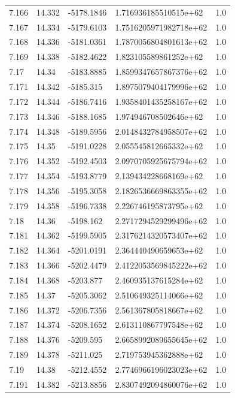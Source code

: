\begin{tabular}{lllll}
7.166 & 14.332 & -5178.1846 & 1.716936185510515e+62 & 1.0 \\
7.167 & 14.334 & -5179.6103 & 1.7516205971982718e+62 & 1.0 \\
7.168 & 14.336 & -5181.0361 & 1.7870056804801613e+62 & 1.0 \\
7.169 & 14.338 & -5182.4622 & 1.823105589861252e+62 & 1.0 \\
7.17 & 14.34 & -5183.8885 & 1.8599347657867376e+62 & 1.0 \\
7.171 & 14.342 & -5185.315 & 1.8975079404179996e+62 & 1.0 \\
7.172 & 14.344 & -5186.7416 & 1.9358401435258167e+62 & 1.0 \\
7.173 & 14.346 & -5188.1685 & 1.974946708502646e+62 & 1.0 \\
7.174 & 14.348 & -5189.5956 & 2.0148432784958507e+62 & 1.0 \\
7.175 & 14.35 & -5191.0228 & 2.055545812665332e+62 & 1.0 \\
7.176 & 14.352 & -5192.4503 & 2.0970705925675794e+62 & 1.0 \\
7.177 & 14.354 & -5193.8779 & 2.139434228668169e+62 & 1.0 \\
7.178 & 14.356 & -5195.3058 & 2.1826536669863355e+62 & 1.0 \\
7.179 & 14.358 & -5196.7338 & 2.226746195873795e+62 & 1.0 \\
7.18 & 14.36 & -5198.162 & 2.2717294529299496e+62 & 1.0 \\
7.181 & 14.362 & -5199.5905 & 2.3176214320573407e+62 & 1.0 \\
7.182 & 14.364 & -5201.0191 & 2.364440490659653e+62 & 1.0 \\
7.183 & 14.366 & -5202.4479 & 2.4122053569845222e+62 & 1.0 \\
7.184 & 14.368 & -5203.877 & 2.460935137615284e+62 & 1.0 \\
7.185 & 14.37 & -5205.3062 & 2.510649325114066e+62 & 1.0 \\
7.186 & 14.372 & -5206.7356 & 2.561367805818667e+62 & 1.0 \\
7.187 & 14.374 & -5208.1652 & 2.613110867797548e+62 & 1.0 \\
7.188 & 14.376 & -5209.595 & 2.6658992089655645e+62 & 1.0 \\
7.189 & 14.378 & -5211.025 & 2.719753945362888e+62 & 1.0 \\
7.19 & 14.38 & -5212.4552 & 2.7746966196023023e+62 & 1.0 \\
7.191 & 14.382 & -5213.8856 & 2.8307492094860076e+62 & 1.0 \\

\end{tabular}

